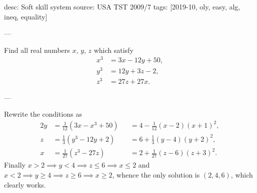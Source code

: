 desc: Soft skill system
source: USA TST 2009/7
tags: [2019-10, oly, easy, alg, ineq, equality]

---

Find all real numbers $x$, $y$, $z$ which satisfy
\begin{align*}
    x^3&=3x-12y+50,\\
    y^3&=12y+3z-2,\\
    z^3&=27z+27x.
\end{align*}

---

Rewrite the conditions as
\begin{alignat*}2
    y&=\tfrac1{12}(3x-x^3+50)&&=4-\tfrac1{12}(x-2)(x+1)^2,\\
    z&=\tfrac13(y^3-12y+2)&&=6+\tfrac13(y-4)(y+2)^2,\\
    x&=\tfrac1{27}(z^3-27z)&&=2+\tfrac1{27}(z-6)(z+3)^2.
\end{alignat*}
Finally $x>2\implies y<4\implies z\le6\implies x\le2$ and $x<2\implies y\ge4\implies z\ge6\implies x\ge2$, whence the only solution is $(2,4,6)$, which clearly works.
